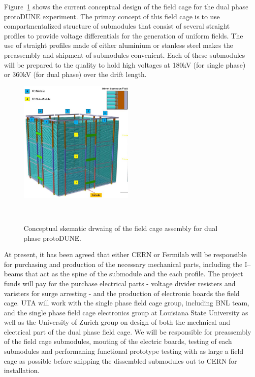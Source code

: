 Figure~\ref{fig:if-dp-fc} shows the current conceptual design of the field cage for the dual phase protoDUNE experiment.   The primay concept of this field cage is to use compartmentalized structure of submodules that consist of several straight profiles to provide voltage differentials for the generation of uniform fields.   The use of straight profiles made of either aluminium or stanless steel makes the preassembly and shipment of submodules convenient.   Each of these submodules will be prepared to the quality to hold high voltages at 180kV (for single phase) or  360kV (for dual phase) over the drift length.  
\begin{figure}[htb]
\centering
\includegraphics[width=0.50\textwidth]{images/if-dp-fc.jpg}
\caption[]{Conceptual skematic drwaing of the field cage assembly for dual phase protoDUNE.}
~\label{fig:if-dp-fc}
\end{figure}

At present, it has been agreed that either CERN or Fermilab will be responsible for purchasing and production of the necessary mechanical parts, including the I--beams that act as the spine of the submodule and the each profile.  The project funds will pay for the purchase electrical parts - voltage divider resisters and varisters for surge arresting - and the production of electronic boards the field cage.  UTA will work with the single phase field cage group, including BNL team, and the single phase field cage electronics group at Louisiana State University as well as the University of Zurich group on design of both the mechnical and electrical part of the dual phase field cage.   We will be responsible for preassembly of the field cage submodules, mouting of the electric boards, testing of each submodules and performaning functional prototype testing with as large a field cage as possible before shipping the dissembled submodules out to CERN for installation.

